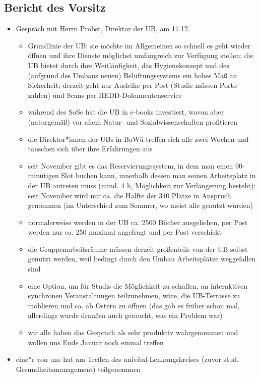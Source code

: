 \subsection{Bericht des Vorsitz}
\begin{itemize}
    \item {Gespräch mit Herrn Probst, Direktor der UB, am 17.12.
    \begin{itemize}
        \item Grundlinie der UB: sie möchte im Allgemeinen so schnell es geht wieder öffnen und ihre Dienste möglichst umfangreich zur Verfügung stellen; die UB bietet durch ihre Weitläufigkeit, das Hygienekonzept und des (aufgrund des Umbaus neuen) Belüftungssystems ein hohes Maß an Sicherheit; derzeit geht nur Ausleihe per Post (Studis müssen Porto zahlen) und Scans per HEDD-Dokumentenservice
        \item während des SoSe hat die UB in e-books investiert, wovon aber (naturgemäß) vor allem Natur- und Sozialwissenschaften profitieren
        \item die Direktor*innen der UBs in BaWü treffen sich alle zwei Wochen und tauschen sich über ihre Erfahrungen aus
        \item seit November gibt es das Reservierungssystem, in dem man einen 90-minütigen Slot buchen kann, innerhalb dessen man seinen Arbeitsplatz in der UB antreten muss (mind. 4 h, Möglichkeit zur Verlängerung besteht); seit November wird nur ca. die Hälfte der 340 Plätze in Anspruch genommen (im Unterschied zum Sommer, wo meist alle genutzt wurden)
        \item normalerweise werden in der UB ca. 2500 Bücher ausgeliehen, per Post werden nur ca. 250 maximal angefragt und per Post verschickt
        \item die Gruppenarbeitsräume müssen derzeit großenteils von der UB selbst genutzt werden, weil bedingt durch den Umbau Arbeitsplätze weggefallen sind
        \item eine Option, um für Studis die Möglichkeit zu schaffen, an interaktiven synchronen Veranstaltungen teilzunehmen, wäre, die UB-Terrasse zu möblieren und ca. ab Ostern zu öffnen (das gab es früher schon mal, allerdings wurde draußen auch geraucht, was ein Problem war)
        \item wir alle haben das Gespräch als sehr produktiv wahrgenommen und wollen uns Ende Januar noch einmal treffen
    \end{itemize}
    }
    \item eine*r von uns hat am Treffen des univital-Lenkungskreises (zuvor stud. Gesundheitsmanagement) teilgenommen

\end{itemize}
